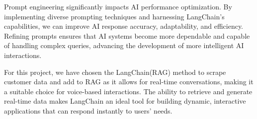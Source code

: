Prompt engineering significantly impacts AI performance optimization. By implementing diverse 
prompting techniques and harnessing LangChain's capabilities, we can improve AI response accuracy, 
adaptability, and efficiency. Refining prompts ensures that AI systems become more dependable and 
capable of handling complex queries, advancing the development of more intelligent AI interactions.

For this project, we have chosen the LangChain(RAG) method to scrape customer data and add to RAG as it allows for real-time conversations, making it a suitable choice for voice-based interactions. The ability to retrieve and generate real-time data makes LangChain an ideal tool for building dynamic, interactive applications that can respond instantly to users' needs.


